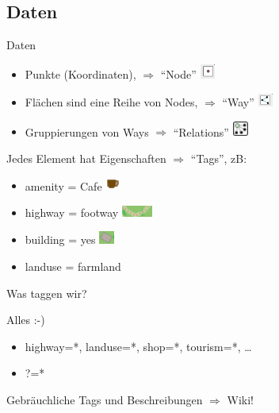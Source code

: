 \documentclass{beamer}
\begin{document}
\subsection{Daten}
\begin{frame}{Daten}

\begin{itemize}
  \item Punkte (Koordinaten), $\Rightarrow$ ``Node'' \includegraphics[width=0.5cm]{node.png}
  \item Flächen sind eine Reihe von Nodes, $\Rightarrow$ ``Way'' \includegraphics[width=0.5cm]{way.png}
  \item Gruppierungen von Ways $\Rightarrow$ ``Relations'' \includegraphics[width=0.5cm]{relation.png}
\end{itemize}

\pause

Jedes Element hat Eigenschaften $\Rightarrow$ ``Tags'', zB:
\begin{itemize}
  \item amenity = Cafe \includegraphics[width=0.5cm]{cafe.png}
  \item highway = footway \includegraphics[width=1cm]{footway.png}
  \item building = yes  \includegraphics[width=0.5cm]{building.png}
  \item landuse = farmland 
\end{itemize}

\pause

Was taggen wir?

\pause

Alles :-)

\begin{itemize}
  \item highway=*, landuse=*, shop=*, tourism=*, \dots
  \item ?=*
\end{itemize}

Gebräuchliche Tags und Beschreibungen $\Rightarrow$ Wiki!

\end{frame}
\end{document}
